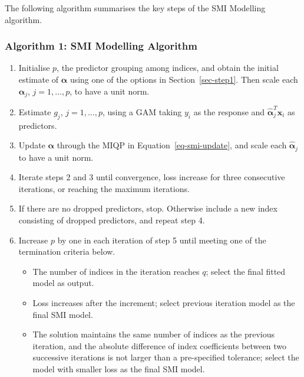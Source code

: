 \documentclass[
  11pt,
  a4paper,
]{article}
\providecommand{\tightlist}{%
  \setlength{\itemsep}{0pt}\setlength{\parskip}{0pt}}\usepackage{longtable,booktabs,array}
\begin{document}
The following algorithm summarises the key steps of the SMI Modelling
algorithm. \newline

\subsubsection*{Algorithm 1: SMI Modelling
Algorithm}\label{algorithm-1-smi-modelling-algorithm}

\begin{enumerate}
\def\labelenumi{\arabic{enumi}.}
\tightlist
\item
  Initialise \(p\), the predictor grouping among indices, and obtain the
  initial estimate of \(\bm{\alpha}\) using one of the options in
  Section~\ref{sec-step1}. Then scale each \(\hat{\bm{\alpha}}_{j}\),
  \(j=1,\dots,p\), to have a unit norm.
\item
  Estimate \(g_{j}\), \(j=1,\dots,p\), using a GAM taking \(y_{i}\) as
  the response and \(\hat{\bm{\alpha}}_{j}^{T}\bm{x}_{i}\) as
  predictors.
\item
  Update \(\bm{\alpha}\) through the MIQP in
  Equation~\ref{eq-smi-update}, and scale each \(\hat{\bm{\alpha}}_{j}\)
  to have a unit norm.
\item
  Iterate steps 2 and 3 until convergence, loss increase for three
  consecutive iterations, or reaching the maximum iterations.
\item
  If there are no dropped predictors, stop. Otherwise include a new
  index consisting of dropped predictors, and repeat step 4.
\item
  Increase \(p\) by one in each iteration of step 5 until meeting one of
  the termination criteria below.

  \begin{itemize}
  \tightlist
  \item
    The number of indices in the iteration reaches \(q\); select the
    final fitted model as output.
  \item
    Loss increases after the increment; select previous iteration model
    as the final SMI model.
  \item
    The solution maintains the same number of indices as the previous
    iteration, and the absolute difference of index coefficients between
    two successive iterations is not larger than a pre-specified
    tolerance; select the model with smaller loss as the final SMI
    model.
  \end{itemize}
\end{enumerate}
\end{document}
